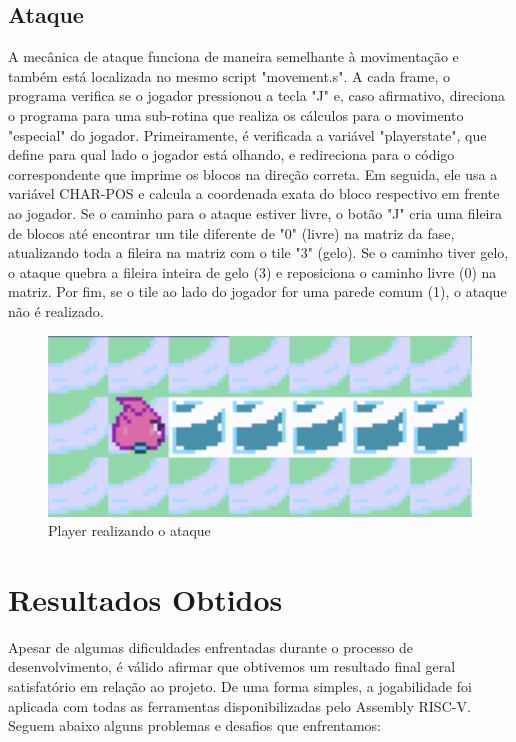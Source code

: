 \documentclass[a4paper]{sbgames}
\begin{document}
\subsection{Ataque}{
\label{sec:att}

A mecânica de ataque funciona de maneira semelhante à movimentação e também está localizada no mesmo script "movement.s". A cada frame, o programa verifica se o jogador pressionou a tecla "J" e, caso afirmativo, direciona o programa para uma sub-rotina que realiza os cálculos para o movimento "especial" do jogador. Primeiramente, é verificada a variável "playerstate", que define para qual lado o jogador está olhando, e redireciona para o código correspondente que imprime os blocos na direção correta. Em seguida, ele usa a variável CHAR-POS e calcula a coordenada exata do bloco respectivo em frente ao jogador. Se o caminho para o ataque estiver livre, o botão "J" cria uma fileira de blocos até encontrar um tile diferente de "0" (livre) na matriz da fase, atualizando toda a fileira na matriz com o tile "3" (gelo). Se o caminho tiver gelo, o ataque quebra a fileira inteira de gelo (3) e reposiciona o caminho livre (0) na matriz. Por fim, se o tile ao lado do jogador for uma parede comum (1), o ataque não é realizado.
}
\begin{figure}[H]
  \begin{center}
   \includegraphics[width=1.0\linewidth]{./Figures/ataque.PNG}
  \end{center}
  \caption{Player realizando o ataque}
  \label{fig:05}
  \end{figure}


\newpage

\section{Resultados Obtidos}
\label{sec:Resultados}

Apesar de algumas dificuldades enfrentadas durante o processo de desenvolvimento, é válido afirmar que obtivemos um resultado final geral satisfatório em relação ao projeto. De uma forma simples, a jogabilidade foi aplicada com todas as ferramentas disponibilizadas pelo Assembly RISC-V. Seguem abaixo alguns problemas e desafios que enfrentamos:
\end{document}
